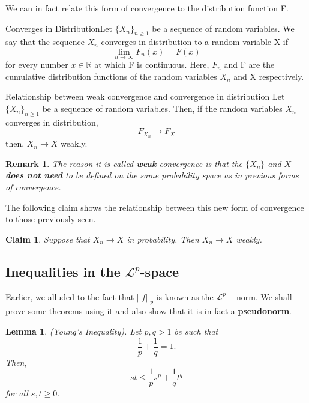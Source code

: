 \documentclass[twoside]{article}
\newtheorem{lemma}[theorem]{Lemma}
\newtheorem{claim}[theorem]{Claim}
\newtheorem{remark}[theorem]{Remark}
\begin{document}
We can in fact relate this form of convergence to the distribution function F.

\begin{definition_exam}{Converges in Distribution}{}Let $\{X_n\}_{n \geq 1}$ be a sequence of random variables. We say that the sequence $X_n$ converges in distribution to a random variable X if 
$$
\lim_{n \rightarrow \infty}F_n(x) = F(x)
$$
for every number $x \in \mathbb{R}$ at which F is continuous. Here, $F_n$ and F are the cumulative distribution functions of the random variables $X_n$ and X respectively.
\end{definition_exam}

\begin{proposition_exam}{Relationship between weak convergence and convergence in distribution}{} Let $\{X_n\}_{n \geq 1}$ be a sequence of random variables. Then, if the random variables $X_n$ converges in distribution, 
$$
F_{X_n} \rightarrow F_X
$$
then, $X_n \rightarrow X$ weakly.
\end{proposition_exam}

\begin{remark} The reason it is called \textbf{weak} convergence is that the $\{X_n\}$ and $X$ \textbf{does not need} to be defined on the same probability space as in previous forms of convergence.
\end{remark}

The following claim shows the relationship between this new form of convergence to those previously seen.

\begin{claim} Suppose that $X_n \rightarrow X$ in probability. Then $X_n \rightarrow X$ weakly.
\end{claim}

\subsection{Inequalities in the $\mathcal{L}^p$-space}

Earlier, we alluded to the fact that $||f||_p$ is known as the $\mathcal{L}^p-$norm. We shall prove some theorems using it and also show that it is in fact a \textbf{pseudonorm}.

\begin{lemma}(Young's Inequality). Let $p, q > 1$ be such that 
$$
\frac{1}{p} + \frac{1}{q} = 1.
$$
Then,
$$
st \leq \frac{1}{p}s^p + \frac{1}{q}t^q
$$
for all $s,t \geq 0.$
\end{lemma}
\end{document}
